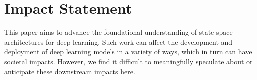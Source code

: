 \section*{Impact Statement}

This paper aims to advance the foundational understanding of state-space architectures for deep learning. Such work can affect the development and deployment of deep learning models in a variety of ways, which in turn can have societal impacts. However, we find it difficult to meaningfully speculate about or anticipate these downstream impacts here.



